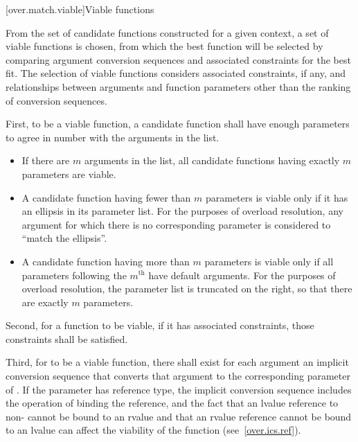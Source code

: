 %

[over.match.viable]{Viable functions}%

\pnum
From the set of candidate functions constructed for a given
context, a set of viable functions is
chosen, from which the best function will be selected by
comparing argument conversion sequences
and associated constraints
for the best fit.
The selection of viable functions considers
associated constraints, if any, and
relationships between arguments and function parameters other
than the ranking of conversion sequences.

\pnum
{}%
%
First, to be a viable function, a candidate function shall have
enough parameters to agree in number with the arguments in the
list.

\begin{itemize}
\item
If there are $m$ arguments in the list,
all candidate functions having exactly $m$ parameters are viable.
\item
A candidate function having fewer than $m$ parameters is viable
only if it has an ellipsis in its parameter list.
For the purposes of overload resolution,
any argument for which there is no corresponding parameter is
considered to ``match the ellipsis''.
\item
A candidate function having more than $m$ parameters is viable
only if all parameters following the $m^\text{th}$
have default arguments.
For the purposes of overload resolution,
the parameter list is truncated on the right,
so that there are exactly $m$ parameters.
\end{itemize}

\pnum
Second, for a function to be viable, if it has associated constraints,
those constraints shall be satisfied.

\pnum
Third, for
to be a viable function, there shall exist for each
argument an
implicit conversion sequence that
converts that argument to the corresponding parameter of
.
If the parameter has reference type, the implicit conversion sequence
includes the operation of binding the reference, and the fact that
an lvalue reference to non- cannot be bound to an rvalue
and that an rvalue reference cannot be bound to an lvalue
can affect
the viability of the function (see~\ref{over.ics.ref}).

